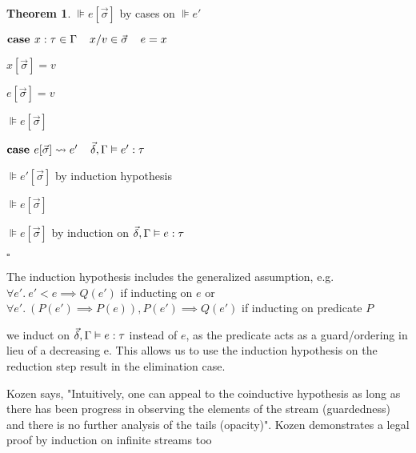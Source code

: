 \documentclass[acmsmall]{acmart}
\theoremstyle{definition}
\newtheorem{theorem}{Theorem}[section]
\begin{document}
\begin{theorem}
      \item \Z\Z $\VDash e[\vec{\sigma}] $ by cases on $\VDash e' $

    \item \Z {}

    \item \Z $\textbf{case } 
      x : \tau \in \Gamma
      \hspace{4mm} 
      x \slash v \in \vec{\sigma}
      \hspace{4mm} 
      e = x
    $
      \item \Z\Z $x[\vec{\sigma}] = v$
      \item \Z\Z $e[\vec{\sigma}] = v$
      \item \Z\Z $\VDash e[\vec{\sigma}] $

    \item \Z $\textbf{case } 
      e[\vec{\sigma}] \rightsquigarrow e' 
      \hspace{4mm} 
      \vec{\delta}, \Gamma \vDash e' : \tau
    $ 
      \item \Z\Z $\VDash e'[\vec{\sigma}] $ by induction hypothesis
      \item \Z\Z $\VDash e[\vec{\sigma}] $

    \item \Z $\VDash e[\vec{\sigma}] $ by induction on $\vec{\delta}, \Gamma \vDash e : \tau$
  \item $\square$
  \item {}
\end{theorem}

\noindent
{} The induction hypothesis includes the generalized assumption, e.g. $\forall e' .\ e' < e \implies Q(e')$ if inducting on $e$ or $\forall e' .\ (P(e') \implies P(e)), P(e') \implies Q(e')$ if inducting on predicate $P$

\noindent
{} we induct on $\vec{\delta}, \Gamma \vDash e : \tau$ instead of $e$, as the predicate acts as a guard/ordering in lieu of a decreasing e.
This allows us to use the induction hypothesis on the reduction step result in the elimination case.

\noindent
{} Kozen says, "Intuitively, one can appeal to the coinductive hypothesis as long as there
has been progress in observing the elements of the stream (guardedness) and there is no
further analysis of the tails (opacity)".  Kozen demonstrates a legal proof by induction on infinite streams too

\end{document}
